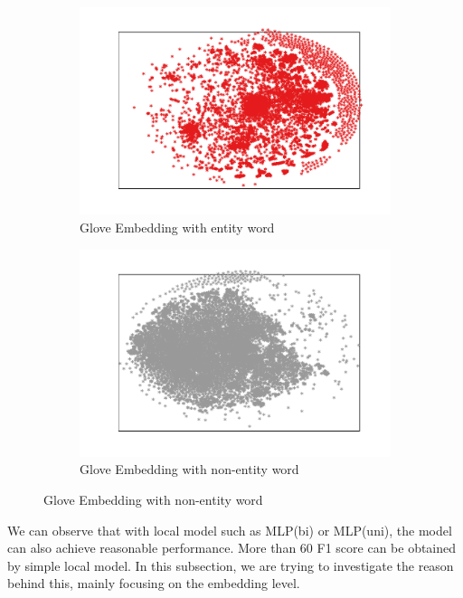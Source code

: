 \documentclass{article}
\begin{document}
\begin{itemize}
\begin{figure}[t]
	\centering
	\begin{subfigure}{0.5\textwidth}
		\includegraphics[width=\linewidth]{glove_embedding_positive.pdf}
		\caption{Glove Embedding with entity word}
		\label{fig:glove_positive}
	\end{subfigure}\hfil 
	\begin{subfigure}{0.5\textwidth}
		\includegraphics[width=\linewidth]{glove_embedding_negative.pdf}
		\caption{Glove Embedding with non-entity word}
		\label{fig:glove_negative}
	\end{subfigure}
\end{figure}

We can observe that with local model such as MLP(bi) or MLP(uni), the model can also achieve reasonable performance. More than 60 F1 score can be obtained by simple local model. In this subsection, we are trying to investigate the reason behind this, mainly focusing on the embedding level. 


\end{itemize}
\end{document}
